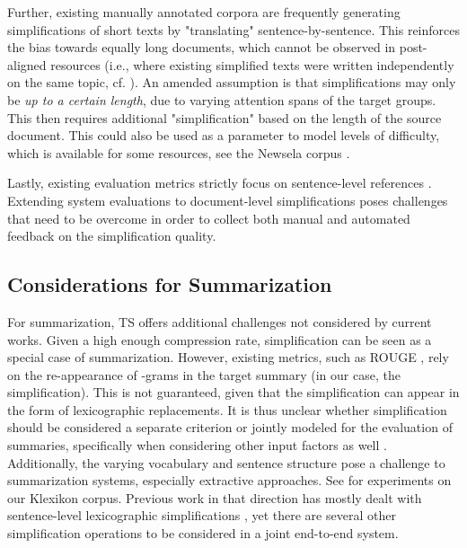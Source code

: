 \documentclass[10pt, a4paper]{article}
\begin{document}
Further, existing manually annotated corpora are frequently generating simplifications of short texts by "translating" sentence-by-sentence. This reinforces the bias towards equally long documents, which cannot be observed in post-aligned resources (i.e., where existing simplified texts were written independently on the same topic, cf. ).
An amended assumption is that simplifications may only be \emph{up to a certain length}, due to varying attention spans of the target groups. This then requires additional "simplification" based on the length of the source document.
This could also be used as a parameter to model levels of difficulty, which is available for some resources, see the Newsela corpus \cite{xu-etal-2015-problems}.

Lastly, existing evaluation metrics strictly focus on sentence-level references \cite{xu-etal-2016-optimizing}. Extending system evaluations to document-level simplifications poses challenges that need to be overcome in order to collect both manual and automated feedback on the simplification quality.




\subsection{Considerations for Summarization}
For summarization, TS offers additional challenges not considered by current works.
Given a high enough compression rate, simplification can be seen as a special case of summarization. However, existing metrics, such as  ROUGE \cite{lin-2004-rouge}, rely on the re-appearance of -grams in the target summary (in our case, the simplification). This is not guaranteed, given that the simplification can appear in the form of lexicographic replacements. 
It is thus unclear whether simplification should be considered a separate criterion or jointly modeled for the evaluation of summaries, specifically when considering other input factors as well \cite{ter2020makes}.
Additionally, the varying vocabulary and sentence structure pose a challenge to summarization systems, especially extractive approaches. See  for experiments on our Klexikon corpus.
Previous work in that direction has mostly dealt with sentence-level lexicographic simplifications \cite{siddharthan-etal-2004-syntactic}, yet there are several other simplification operations to be considered \cite{amancio-specia-2014-analysis} in a joint end-to-end system.
\end{document}
